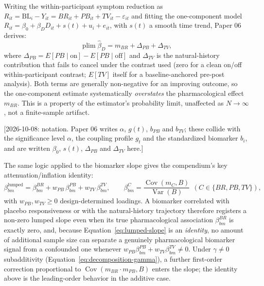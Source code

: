 \documentclass[11pt]{article}
\newcommand{\note}[1]{\textcolor{blue!60!black}{\small [#1]}}
\begin{document}
Writing the within-participant symptom reduction as $R_{it} =
\mathrm{BL}_i - Y_{it} = BR_{it} + PB_{it} + TV_{it} - \varepsilon_{it}$
and fitting the one-component model $R_{it} = \beta_0 + \beta_D D_{it} +
s(t) + u_i + e_{it}$, with $s(t)$ a smooth time trend, Paper 06
derives:
\begin{equation}
\operatorname*{plim}\hat\beta_D = m_{BR} + \Delta_{PB} + \Delta_{TV},
\label{eq:plim-betaD}
\end{equation}
where $\Delta_{PB} = E[PB\mid\text{on}] - E[PB\mid\text{off}]$ and
$\Delta_{TV}$ is the natural-history contribution that fails to cancel
under the contrast used (zero for a clean on/off within-participant
contrast; $E[TV]$ itself for a baseline-anchored pre-post analysis).
Both terms are generally non-negative for an improving outcome, so the
one-component estimate systematically \emph{overstates} the
pharmacological effect $m_{BR}$. This is a property of the estimator's
probability limit, unaffected as $N\to\infty$, not a finite-sample
artifact.

\note{2026-10-08: notation. Paper 06 writes $\alpha$, $g(t)$, $b_{PB}$
and $b_{TV}$; these collide with the significance level $\alpha$, the
coupling profile $g_t$ and the standardized biomarker $b_i$, and are
written $\beta_0$, $s(t)$, $\Delta_{PB}$ and $\Delta_{TV}$ here.}

The same logic applied to the biomarker slope gives the compendium's
key attenuation/inflation identity:
\begin{equation}
\beta_{bm}^{\mathrm{lumped}} = \beta_{bm}^{BR} + w_{PB}\,\beta_{bm}^{PB}
  + w_{TV}\,\beta_{bm}^{TV}, \qquad
\beta_{bm}^{C} = \frac{\operatorname{Cov}(m_C, B)}{\operatorname{Var}(B)}
  \ \ (C \in \{BR, PB, TV\}),
\label{eq:lumped-slope}
\end{equation}
with $w_{PB}, w_{TV}\ge0$ design-determined loadings. A biomarker
correlated with placebo responsiveness or with the natural-history
trajectory therefore registers a non-zero lumped slope even when its
true pharmacological association $\beta_{bm}^{BR}$ is exactly zero,
and, because Equation~\eqref{eq:lumped-slope} is an \emph{identity},
no amount of additional sample size can separate a genuinely
pharmacological biomarker signal from a confounded one whenever
$w_{PB}\beta_{bm}^{PB} + w_{TV}\beta_{bm}^{TV}\ne0$. Under
$\gamma\ne0$ subadditivity (Equation~\eqref{eq:decomposition-gamma}),
a further first-order correction proportional to
$\operatorname{Cov}(m_{BR}\cdot m_{PB}, B)$ enters the slope; the
identity above is the leading-order behavior in the additive case.
\end{document}
